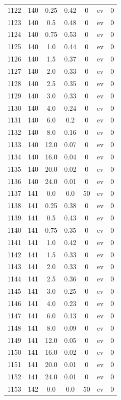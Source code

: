 \documentclass[12pt,a4paper]{article}
\begin{document}
\begin{tabular}{r|cccccc}
	1122 & 140 & 0.25 & 0.42 & 0 & ev & 0 \\
	1123 & 140 & 0.5 & 0.48 & 0 & ev & 0 \\
	1124 & 140 & 0.75 & 0.53 & 0 & ev & 0 \\
	1125 & 140 & 1.0 & 0.44 & 0 & ev & 0 \\
	1126 & 140 & 1.5 & 0.37 & 0 & ev & 0 \\
	1127 & 140 & 2.0 & 0.33 & 0 & ev & 0 \\
	1128 & 140 & 2.5 & 0.35 & 0 & ev & 0 \\
	1129 & 140 & 3.0 & 0.33 & 0 & ev & 0 \\
	1130 & 140 & 4.0 & 0.24 & 0 & ev & 0 \\
	1131 & 140 & 6.0 & 0.2 & 0 & ev & 0 \\
	1132 & 140 & 8.0 & 0.16 & 0 & ev & 0 \\
	1133 & 140 & 12.0 & 0.07 & 0 & ev & 0 \\
	1134 & 140 & 16.0 & 0.04 & 0 & ev & 0 \\
	1135 & 140 & 20.0 & 0.02 & 0 & ev & 0 \\
	1136 & 140 & 24.0 & 0.01 & 0 & ev & 0 \\
	1137 & 141 & 0.0 & 0.0 & 50 & ev & 0 \\
	1138 & 141 & 0.25 & 0.38 & 0 & ev & 0 \\
	1139 & 141 & 0.5 & 0.43 & 0 & ev & 0 \\
	1140 & 141 & 0.75 & 0.35 & 0 & ev & 0 \\
	1141 & 141 & 1.0 & 0.42 & 0 & ev & 0 \\
	1142 & 141 & 1.5 & 0.33 & 0 & ev & 0 \\
	1143 & 141 & 2.0 & 0.33 & 0 & ev & 0 \\
	1144 & 141 & 2.5 & 0.36 & 0 & ev & 0 \\
	1145 & 141 & 3.0 & 0.25 & 0 & ev & 0 \\
	1146 & 141 & 4.0 & 0.23 & 0 & ev & 0 \\
	1147 & 141 & 6.0 & 0.13 & 0 & ev & 0 \\
	1148 & 141 & 8.0 & 0.09 & 0 & ev & 0 \\
	1149 & 141 & 12.0 & 0.05 & 0 & ev & 0 \\
	1150 & 141 & 16.0 & 0.02 & 0 & ev & 0 \\
	1151 & 141 & 20.0 & 0.01 & 0 & ev & 0 \\
	1152 & 141 & 24.0 & 0.01 & 0 & ev & 0 \\
	1153 & 142 & 0.0 & 0.0 & 50 & ev & 0 \\

\end{tabular}
\end{document}
